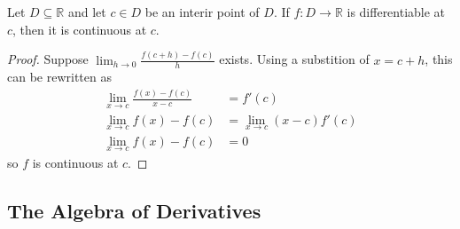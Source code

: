 \begin{prop}
    Let $D \subseteq \mathbb{R}$ and let $c \in D$ be an interir point of $D$. If $f:D \rightarrow \mathbb{R}$ is differentiable at $c$, then it is continuous at $c$.
\end{prop}
\begin{proof}
  Suppose $\lim_{h \rightarrow 0} \frac{f(c + h) - f(c)}{h}$ exists. Using a substition of $x = c + h$, this can be rewritten as
  \begin{align*}
    \lim_{x \rightarrow c} \frac{f(x) - f(c)}{x - c} &= f'(c) \\
    \lim_{x \rightarrow c} f(x) - f(c) &= \lim_{x \rightarrow c} (x - c) f'(c) \\
    \lim_{x \rightarrow c} f(x) - f(c) &= 0
  \end{align*}
  so $f$ is continuous at $c$.
\end{proof}

\subsection{The Algebra of Derivatives}

